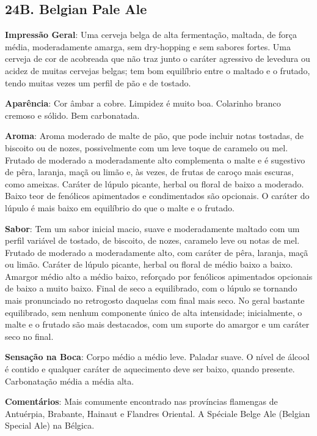 \subsection*{24B. Belgian Pale Ale}
\textbf{Impressão Geral}: Uma cerveja belga de alta fermentação, maltada, de força média, moderadamente amarga, sem dry-hopping e sem sabores fortes. Uma cerveja de cor de acobreada que não traz junto o caráter agressivo de levedura ou acidez de muitas cervejas belgas; tem bom equilíbrio entre o maltado e o frutado, tendo muitas vezes um perfil de pão e de tostado.

\textbf{Aparência}: Cor âmbar a cobre. Limpidez é muito boa. Colarinho branco cremoso e sólido. Bem carbonatada.

\textbf{Aroma}: Aroma moderado de malte de pão, que pode incluir notas tostadas, de biscoito ou de nozes, possivelmente com um leve toque de caramelo ou mel. Frutado de moderado a moderadamente alto complementa o malte e é sugestivo de pêra, laranja, maçã ou limão e, às vezes, de frutas de caroço mais escuras, como ameixas. Caráter de lúpulo picante, herbal ou floral de baixo a moderado. Baixo teor de fenólicos apimentados e condimentados são opcionais. O caráter do lúpulo é mais baixo em equilíbrio do que o malte e o frutado.

\textbf{Sabor}: Tem um sabor inicial macio, suave e moderadamente maltado com um perfil variável de tostado, de biscoito, de nozes, caramelo leve ou notas de mel. Frutado de moderado a moderadamente alto, com caráter de pêra, laranja, maçã ou limão. Caráter de lúpulo picante, herbal ou floral de médio baixo a baixo. Amargor médio alto a médio baixo, reforçado por fenólicos apimentados opcionais de baixo a muito baixo. Final de seco a equilibrado, com o lúpulo se tornando mais pronunciado no retrogosto daquelas com final mais seco. No geral bastante equilibrado, sem nenhum componente único de alta intensidade; inicialmente, o malte e o frutado são mais destacados, com um suporte do amargor e um caráter seco no final.

\textbf{Sensação na Boca}: Corpo médio a médio leve. Paladar suave. O nível de álcool é contido e qualquer caráter de aquecimento deve ser baixo, quando presente. Carbonatação média a média alta.

\textbf{Comentários}: Mais comumente encontrado nas províncias flamengas de Antuérpia, Brabante, Hainaut e Flandres Oriental. A Spéciale Belge Ale (Belgian Special Ale) na Bélgica.

